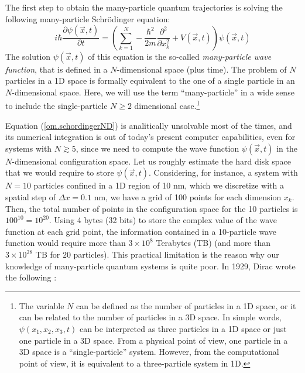\documentclass[onecolumn,nofootinbib, secnumarabic, amsmath, nobibnotes,11pt,aps,pra]{revtex4-1}
\newcommand{\Eref}[1]{Equation (\ref{#1})}
\begin{document}
The first step to obtain the many-particle quantum trajectories is solving the following many-particle Schr\"{o}dinger equation:
\begin{equation}
\label{om.schordingerND}
i \hbar \frac{\partial \psi(\vec{x},t)}{\partial t} = \left(\sum_{k = 1}^N -\frac{\hbar^2}{2m}\frac {\partial^2} {\partial x_k^2} + V(\vec{x},t) \right) \psi(\vec{x},t)
\end{equation}
The solution $\psi(\vec{x},t)$ of this equation is the so-called
\textit{many-particle wave function}, that is defined in a
$N$-dimensional space (plus time). The problem of $N$ particles in a
1D space is formally equivalent to the one of a single particle in
an $N$-dimensional space. Here, we will use the term ``many-particle''
in a wide sense to include the single-particle $N\geq2$
dimensional case.\footnote{The variable $N$ can be defined as the
number of particles in a 1D space, or it can be related to the
number of particles in a 3D space. In
simple words, $\psi(x_1,x_2,x_3,t)$ can be interpreted as three
particles in a 1D space or just one particle in a 3D space. From a
physical point of view, one particle in a 3D space is a
``single-particle'' system. However, from the computational point of
view, it is equivalent to a three-particle system in 1D.}

\Eref{om.schordingerND} is analitically unsolvable most of the times, and its numerical integration is out of today's present computer capabilities, even for systems with $N \gtrsim 5$, since we need to compute the wave function $\psi(\vec{x},t)$ in the $N$-dimensional configuration space.
Let us roughly estimate the hard disk space that we would require to store $\psi(\vec{x},t)$.
Considering, for instance, a system with $N = 10$ particles confined in a 1D region of 10 nm, which we discretize with a spatial step of $\Delta x = 0.1$ nm, we have a grid of 100 points for each dimension $x_k$.
Then, the total number of points in the configuration space for the 10 particles is $100^{10} = 10^{20}$.
Using 4 bytes (32 bits) to store the complex value of the wave function at each grid point, the information contained in a 10-particle wave function would require more than $3 \times 10^8$ Terabytes (TB) (and more than $3\times 10^{28}$ TB for $20$ particles).
This practical limitation is the reason why our knowledge of many-particle quantum systems is quite poor.
In 1929, Dirac wrote the following \cite{om.dirac1929bis}:\\\vspace*{-6pt}
\end{document}
